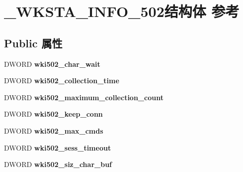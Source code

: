 \hypertarget{struct___w_k_s_t_a___i_n_f_o__502}{}\section{\+\_\+\+W\+K\+S\+T\+A\+\_\+\+I\+N\+F\+O\+\_\+502结构体 参考}
\label{struct___w_k_s_t_a___i_n_f_o__502}
\subsection*{Public 属性}
\begin{DoxyCompactItemize}
\item 
\mbox{\label{struct___w_k_s_t_a___i_n_f_o__502_a225008bbd90aaa282d24531bd3282bdd}} 
D\+W\+O\+RD {\bfseries wki502\+\_\+char\+\_\+wait}
\item 
\mbox{\label{struct___w_k_s_t_a___i_n_f_o__502_aa5bc7a13f3e9f5f6e78ef9064f5f5308}} 
D\+W\+O\+RD {\bfseries wki502\+\_\+collection\+\_\+time}
\item 
\mbox{\label{struct___w_k_s_t_a___i_n_f_o__502_ac84c376ba5734b0ae3f9e9181fe7d2d2}} 
D\+W\+O\+RD {\bfseries wki502\+\_\+maximum\+\_\+collection\+\_\+count}
\item 
\mbox{\label{struct___w_k_s_t_a___i_n_f_o__502_a32d0c7a87262e7b1f07ed183ab3a57ab}} 
D\+W\+O\+RD {\bfseries wki502\+\_\+keep\+\_\+conn}
\item 
\mbox{\label{struct___w_k_s_t_a___i_n_f_o__502_adad65fa698dfc256cfb4a7c897732b5f}} 
D\+W\+O\+RD {\bfseries wki502\+\_\+max\+\_\+cmds}
\item 
\mbox{\label{struct___w_k_s_t_a___i_n_f_o__502_ab01a32f00e3560e7083651f114bec8ba}} 
D\+W\+O\+RD {\bfseries wki502\+\_\+sess\+\_\+timeout}
\item 
\mbox{\label{struct___w_k_s_t_a___i_n_f_o__502_a7fa97a1b8306ec67b8897e0d5d2aab48}} 
D\+W\+O\+RD {\bfseries wki502\+\_\+siz\+\_\+char\+\_\+buf}
\item 

\end{DoxyCompactItemize}
